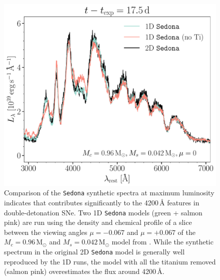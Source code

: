 \documentclass[twocolumn]{aastex631}
\begin{document}
\begin{CJK*}{UTF8}{gbsn}
\begin{figure}
    \centering
    \includegraphics[width=\linewidth]{Ti_II.pdf}
    \caption{Comparison of the \texttt{Sedona} synthetic spectra at maximum luminosity indicates that  contributes significantly to the 4200\,\r{A} features in double-detonation SNe. Two 1D \texttt{Sedona} models (green + salmon pink) are run using the density and chemical profile of a slice between the viewing angles $\mu=-0.067$ and $\mu=+0.067$ of the $M_c=0.96\,\mathrm{M_\odot}$ and $M_s=0.042\,\mathrm{M_\odot}$ model from \citet{Boos_2021}. While the synthetic spectrum in the original 2D \texttt{Sedona} model is generally well reproduced by the 1D runs, the model with all the titanium removed (salmon pink) overestimates the flux around 4200\,\r{A}.}
    \label{fig:Ti}
\end{figure}

\end{CJK*}
\end{document}
